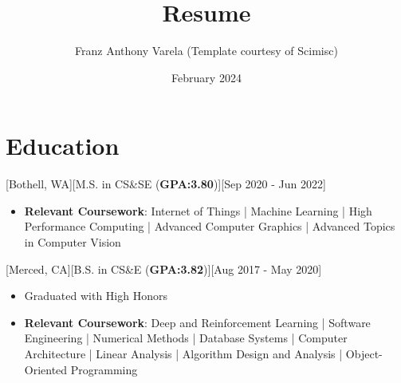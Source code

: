 \documentclass{article}
\title{Resume}
\author{Franz Anthony Varela (Template courtesy of Scimisc)}
\date{February 2024}
\begin{document}
\makecvtitle %


\section{Education}
[Bothell, WA][M.S. in CS\&SE (\textbf{GPA:3.80})][Sep 2020 - Jun 2022]
\begin{itemize}
    \item \textbf{Relevant Coursework}: Internet of Things | Machine Learning | High Performance Computing | Advanced Computer Graphics | Advanced Topics in Computer Vision
\end{itemize}
[Merced, CA][B.S. in CS\&E (\textbf{GPA:3.82})][Aug 2017 - May 2020]
\begin{itemize}
  \item Graduated with High Honors 
  \item \textbf{Relevant Coursework}: Deep and Reinforcement Learning | Software Engineering | Numerical Methods | Database Systems | Computer Architecture | Linear Analysis | Algorithm Design and Analysis | Object-Oriented Programming
\end{itemize}
\end{document}
